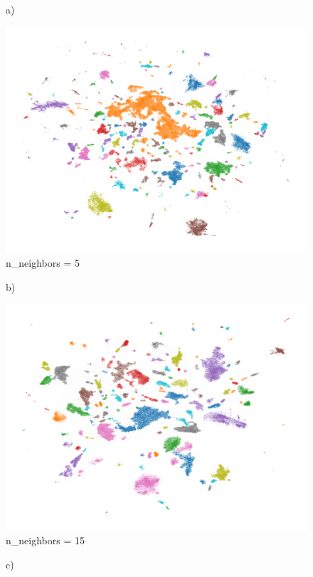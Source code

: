 	\begin{figure}[htb]
		\centering
		\begin{minipage}{.33\textwidth}
			a)\par\medskip %
			\includegraphics[width=\linewidth]{rys04/umap_5_100_100.png}
			n\_neighbors = 5
		\end{minipage}%
		\begin{minipage}{.33\textwidth}
			b)\par\medskip %
			\includegraphics[width=\linewidth]{rys04/umap_15_100_100.png}
			n\_neighbors = 15
		\end{minipage}%
		\begin{minipage}{.33\textwidth}
			c)\par\medskip %

\end{minipage}
\end{figure}
